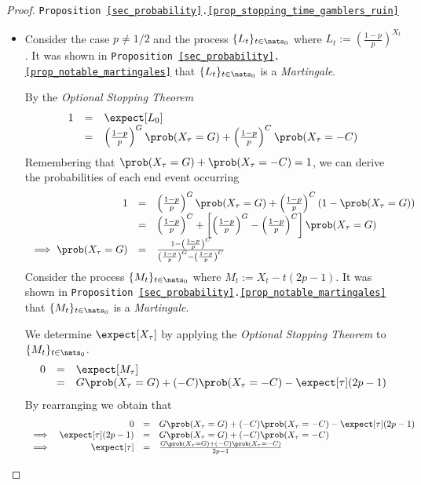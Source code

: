 \documentclass[11pt,a4paper]{article}
\begin{document}
\begin{proof}{\texttt{Proposition \ref{sec_probability}.\ref{prop_stopping_time_gamblers_ruin}}}
\begin{itemize}
      \[ 0=\expect[Z_0]=\expect[Z_\tau]=\expect[X_\tau^2-\tau]=\expect[X_\tau^2]-\expect[\tau] \]
      By rearranging we obtain that
      \[\begin{array}{rcl}
        \expect[\tau]&=&\expect[\tau]\\
        &=&G^2\prob(X_\tau=G)+C^2\prob(X_\tau=-C)\\
        &=&G^2\cdot\frac{C}{C+G}+C^2\frac{G}{C+G}\\
        &=&CG
      \end{array}\]
      \item Consider the case $p\neq1/2$ and the process $\{L_t\}_{t\in\nats_0}$ where $L_t:=\left(\frac{1-p}p\right)^{X_t}$. It was shown in \texttt{Proposition \ref{sec_probability}.\ref{prop_notable_martingales}} that $\{L_t\}_{t\in\nats_0}$ is a \textit{Martingale}.
      \par By the \textit{Optional Stopping Theorem}
      \[\begin{array}{rcl}
        1&=&\expect[L_0]\\
        &=&\left(\frac{1-p}p\right)^G\prob(X_\tau=G)+\left(\frac{1-p}p\right)^C\prob(X_\tau=-C)
      \end{array}\]
      Remembering that $\prob(X_\tau=G)+\prob(X_\tau=-C)=1$, we can derive the probabilities of each end event occurring
      \[\begin{array}{rcl}
        1&=&\left(\frac{1-p}p\right)^G\prob(X_\tau=G)+\left(\frac{1-p}p\right)^C(1-\prob(X_\tau=G))\\
        &=&\left(\frac{1-p}p\right)^C+\left[\left(\frac{1-p}p\right)^G-\left(\frac{1-p}p\right)^C\right]\prob(X_\tau=G)\\
        \implies\prob(X_\tau=G)&=&\frac{1-\left(\frac{1-p}p\right)^C}{\left(\frac{1-p}p\right)^G-\left(\frac{1-p}p\right)^C}
      \end{array}\]
      Consider the process $\{M_t\}_{t\in\nats_0}$ where $M_t:=X_t-t(2p-1)$. It was shown in \texttt{Proposition \ref{sec_probability}.\ref{prop_notable_martingales}} that $\{M_t\}_{t\in\nats_0}$ is a \textit{Martingale}.
      \par We determine $\expect[X_\tau]$ by applying the \textit{Optional Stopping Theorem} to $\{M_t\}_{t\in\nats_0}$.
      \[\begin{array}{rcl}
        0&=&\expect[M_\tau]\\
        &=&G\prob(X_\tau=G)+(-C)\prob(X_\tau=-C)-\expect[\tau](2p-1)
      \end{array}\]
      By rearranging we obtain that
      \[\begin{array}{rrcl}
        &0&=&G\prob(X_\tau=G)+(-C)\prob(X_\tau=-C)-\expect[\tau](2p-1)\\
        \implies&\expect[\tau](2p-1)&=&G\prob(X_\tau=G)+(-C)\prob(X_\tau=-C)\\
        \implies&\expect[\tau]&=&\frac{G\prob(X_\tau=G)+(-C)\prob(X_\tau=-C)}{2p-1}
      \end{array}\]
    \end{itemize}
    \proved
  \end{proof}
\end{document}
